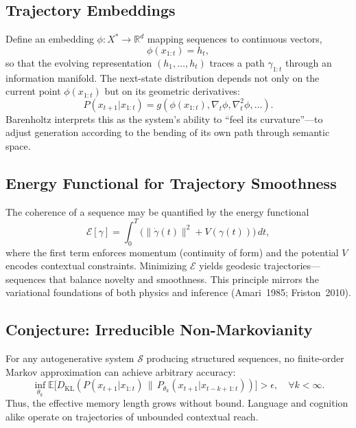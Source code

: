\documentclass[12pt,a4paper,twoside,openright]{book}
\begin{document}
\subsection{Trajectory Embeddings}
Define an embedding $\phi: X^* \to \mathbb{R}^d$ mapping sequences to continuous vectors,
\begin{equation}
\phi(x_{1:t}) = h_t ,
\end{equation}
so that the evolving representation $(h_1,\ldots,h_t)$ traces a path $\gamma_{1:t}$ through an information manifold. The next-state distribution depends not only on the current point $\phi(x_{1:t})$ but on its geometric derivatives:
\begin{equation}
P(x_{t+1}|x_{1:t}) = g(\phi(x_{1:t}), \nabla_t \phi, \nabla_t^2 \phi, \ldots).
\end{equation}
Barenholtz interprets this as the system’s ability to ``feel its curvature''—to adjust generation according to the bending of its own path through semantic space.

\subsection{Energy Functional for Trajectory Smoothness}
The coherence of a sequence may be quantified by the energy functional
\begin{equation}
\mathcal{E}[\gamma] = \int_0^T \!\big(\|\dot{\gamma}(t)\|^2 + V(\gamma(t))\big)\,dt,
\end{equation}
where the first term enforces momentum (continuity of form) and the potential $V$ encodes contextual constraints. Minimizing $\mathcal{E}$ yields geodesic trajectories—sequences that balance novelty and smoothness. This principle mirrors the variational foundations of both physics and inference (Amari~1985; Friston~2010).

\subsection{Conjecture: Irreducible Non-Markovianity}
For any autogenerative system $\mathcal{S}$ producing structured sequences, no finite-order Markov approximation can achieve arbitrary accuracy:
\begin{equation}
\inf_{\theta_k}
\mathbb{E}\big[D_{\mathrm{KL}}(P(x_{t+1}|x_{1:t}) \,\|\, P_{\theta_k}(x_{t+1}|x_{t-k+1:t}))\big]
> \epsilon, \quad \forall k < \infty .
\end{equation}
Thus, the effective memory length grows without bound. Language and cognition alike operate on trajectories of unbounded contextual reach.
\end{document}
